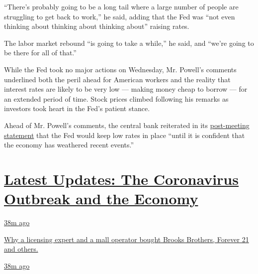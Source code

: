 ``There's probably going to be a long tail where a large number of
people are struggling to get back to work,'' he said, adding that the
Fed was ``not even thinking about thinking about thinking about''
raising rates.

The labor market rebound ``is going to take a while,'' he said, and
``we're going to be there for all of that.''

While the Fed took no major actions on Wednesday, Mr. Powell's comments
underlined both the peril ahead for American workers and the reality
that interest rates are likely to be very low --- making money cheap to
borrow --- for an extended period of time. Stock prices climbed
following his remarks as investors took heart in the Fed's patient
stance.

Ahead of Mr. Powell's comments, the central bank reiterated in its
\href{https://www.federalreserve.gov/newsevents/pressreleases/monetary20200729a.htm}{post-meeting
statement} that the Fed would keep low rates in place ``until it is
confident that the economy has weathered recent events.''

\hypertarget{latest-updates-the-coronavirus-outbreak-and-the-economy}{%
\section{\texorpdfstring{\href{https://www.nytimes3xbfgragh.onion/live/2020/09/09/business/stock-market-today-coronavirus?action=click\&pgtype=Article\&state=default\&region=MAIN_CONTENT_1\&context=storylines_live_updates}{Latest
Updates: The Coronavirus Outbreak and the
Economy}}{Latest Updates: The Coronavirus Outbreak and the Economy}}\label{latest-updates-the-coronavirus-outbreak-and-the-economy}}

\href{https://www.nytimes3xbfgragh.onion/live/2020/09/09/business/stock-market-today-coronavirus?action=click\&pgtype=Article\&state=default\&region=MAIN_CONTENT_1\&context=storylines_live_updates\#why-a-licensing-expert-and-a-mall-operator-bought-brooks-brothers-forever-21-and-others}{38m
ago}

\href{https://www.nytimes3xbfgragh.onion/live/2020/09/09/business/stock-market-today-coronavirus?action=click\&pgtype=Article\&state=default\&region=MAIN_CONTENT_1\&context=storylines_live_updates\#why-a-licensing-expert-and-a-mall-operator-bought-brooks-brothers-forever-21-and-others}{Why
a licensing expert and a mall operator bought Brooks Brothers, Forever
21 and others.}

\href{https://www.nytimes3xbfgragh.onion/live/2020/09/09/business/stock-market-today-coronavirus?action=click\&pgtype=Article\&state=default\&region=MAIN_CONTENT_1\&context=storylines_live_updates\#lvmh-says-it-is-pulling-out-of-its-16-billion-takeover-of-tiffany}{38m
ago}

